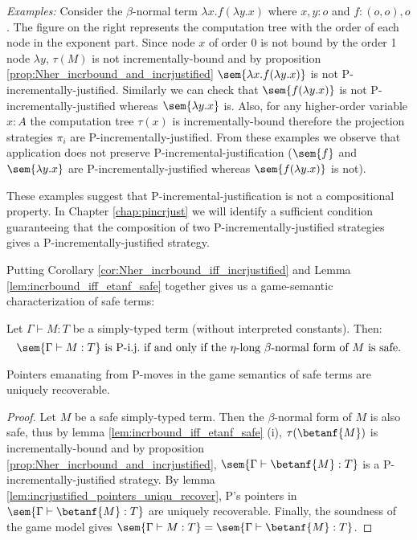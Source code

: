  \noindent \emph{Examples:} Consider the $\beta$-normal term
$\lambda x . f (\lambda y .x)$ where $x,y:o$ and $f:(o,o),o$. The
figure on the right represents the computation tree with the order
of each node in the exponent part. Since node $x$ of order $0$ is
not bound by the order 1 node $\lambda y$, $\tau(M)$ is not
incrementally-bound and by proposition
\ref{prop:Nher_incrbound_and_incrjustified} $\sem{\lambda x . f
(\lambda y .x)}$ is not P-incrementally-justified. Similarly we can
check that $\sem{f (\lambda y .x)}$ is not P-incrementally-justified
whereas $\sem{\lambda y. x}$ is. Also, for any higher-order variable
$x:A$ the computation tree $\tau(x)$ is incrementally-bound
therefore the projection strategies $\pi_i$ are
P-incrementally-justified. From these examples we observe that
application does not preserve P-incremental-justification ($\sem{f}$
and $\sem{\lambda y. x}$ are P-incrementally-justified whereas
$\sem{f (\lambda y .x)}$ is not).
\smallskip

These examples suggest that P-incremental-justification is not a
compositional property. In Chapter \ref{chap:pincrjust} we will
identify a sufficient condition guaranteeing that the composition of
two P-incrementally-justified strategies gives a
P-incrementally-justified strategy. \smallskip


Putting Corollary \ref{cor:Nher_incrbound_iff_incrjustified} and
Lemma \ref{lem:incrbound_iff_etanf_safe} together gives us a
game-semantic characterization of safe terms:
\begin{corollary}
Let $\Gamma \vdash M : T$ be a simply-typed term (without
interpreted constants). Then:
$$ \sem{\Gamma \vdash M : T} \mbox{ is P-i.j.\ if and only if the $\eta$-long $\beta$-normal form of $M$ is safe.} $$
\end{corollary}



\begin{theorem}
\label{thm:safe_ptr_recoverable} Pointers emanating from P-moves in the game semantics of
safe terms are uniquely recoverable.
\end{theorem}
\begin{proof}
Let $M$ be a safe simply-typed term. Then the $\beta$-normal form of
$M$ is also safe, thus by lemma \ref{lem:incrbound_iff_etanf_safe}
(i), $\tau(\betanf{M})$ is incrementally-bound and by proposition
\ref{prop:Nher_incrbound_and_incrjustified}, $\sem{\Gamma \vdash
\betanf{M} :T}$ is a P-incrementally-justified strategy. By lemma
\ref{lem:incrjustified_pointers_uniqu_recover}, P's pointers in
$\sem{\Gamma \vdash \betanf{M} :T}$ are uniquely recoverable.
Finally, the soundness of the game model gives $\sem{\Gamma \vdash
M:T} = \sem{\Gamma \vdash \betanf{M} : T}$.
\end{proof}


